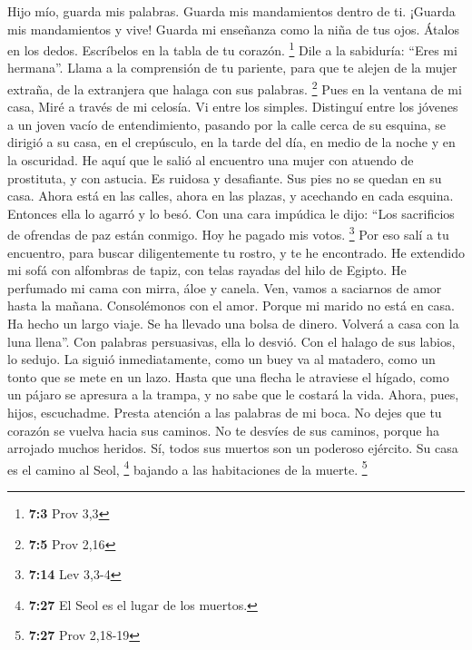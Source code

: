  Hijo mío, guarda mis palabras. Guarda mis mandamientos
dentro de ti.  ¡Guarda mis mandamientos y vive! Guarda mi
enseñanza como la niña de tus ojos.  Átalos en los dedos.
Escríbelos en la tabla de tu corazón. \footnote{\textbf{7:3} Prov 3,3}
 Dile a la sabiduría: ``Eres mi hermana''. Llama a la
comprensión de tu pariente,  para que te alejen de la
mujer extraña, de la extranjera que halaga con sus palabras. \footnote{\textbf{7:5}
  Prov 2,16}  Pues en la ventana de mi casa, Miré a través
de mi celosía.  Vi entre los simples. Distinguí entre los
jóvenes a un joven vacío de entendimiento,  pasando por la
calle cerca de su esquina, se dirigió a su casa,  en el
crepúsculo, en la tarde del día, en medio de la noche y en la oscuridad.
 He aquí que le salió al encuentro una mujer con atuendo
de prostituta, y con astucia.  Es ruidosa y desafiante.
Sus pies no se quedan en su casa.  Ahora está en las
calles, ahora en las plazas, y acechando en cada esquina.
 Entonces ella lo agarró y lo besó. Con una cara impúdica
le dijo:  ``Los sacrificios de ofrendas de paz están
conmigo. Hoy he pagado mis votos. \footnote{\textbf{7:14} Lev 3,3-4}
 Por eso salí a tu encuentro, para buscar diligentemente
tu rostro, y te he encontrado.  He extendido mi sofá con
alfombras de tapiz, con telas rayadas del hilo de Egipto.
 He perfumado mi cama con mirra, áloe y canela.
 Ven, vamos a saciarnos de amor hasta la mañana.
Consolémonos con el amor.  Porque mi marido no está en
casa. Ha hecho un largo viaje.  Se ha llevado una bolsa
de dinero. Volverá a casa con la luna llena''.  Con
palabras persuasivas, ella lo desvió. Con el halago de sus labios, lo
sedujo.  La siguió inmediatamente, como un buey va al
matadero, como un tonto que se mete en un lazo.  Hasta
que una flecha le atraviese el hígado, como un pájaro se apresura a la
trampa, y no sabe que le costará la vida.  Ahora, pues,
hijos, escuchadme. Presta atención a las palabras de mi boca.
 No dejes que tu corazón se vuelva hacia sus caminos. No
te desvíes de sus caminos,  porque ha arrojado muchos
heridos. Sí, todos sus muertos son un poderoso ejército. 
Su casa es el camino al Seol, \footnote{\textbf{7:27} El Seol es el
  lugar de los muertos.} bajando a las habitaciones de la muerte.
\footnote{\textbf{7:27} Prov 2,18-19}

